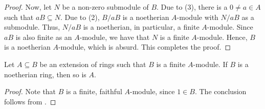 \begin{proof}
    Now, let $N$ be a non-zero submodule of $B$. Due to (3), there is a $0\ne a\in A$ such that $aB\subseteq N$. Due to (2), $B/aB$ is a noetherian $A$-module with $N/aB$ as a submodule. Thus, $N/aB$ is a noetherian, in particular, a finite $A$-module. Since $aB$ is also finite as an $A$-module, we have that $N$ is a finite $A$-module. Hence, $B$ is a noetherian $A$-module, which is absurd. This completes the proof.
\end{proof}

\begin{theorem}
    Let $A\subseteq B$ be an extension of rings such that $B$ is a finite $A$-module. If $B$ is a noetherian ring, then so is $A$.
\end{theorem}
\begin{proof}
    Note that $B$ is a finite, faithful $A$-module, since $1\in B$. The conclusion follows from .
\end{proof}